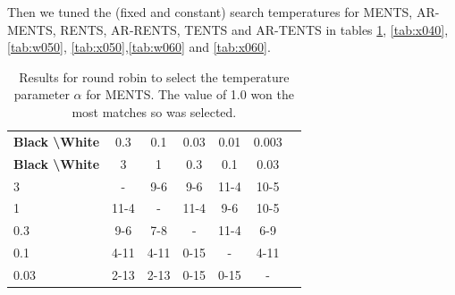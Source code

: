 \documentclass{article}
\theoremstyle{plain}
\begin{document}
\begin{appendices}
            
            
            
            
            
            
            
            
            Then we tuned the (fixed and constant) search temperatures for MENTS, AR-MENTS, RENTS, AR-RENTS, TENTS and AR-TENTS in tables \ref{tab:w040}, \ref{tab:x040},\ref{tab:w050}, \ref{tab:x050},\ref{tab:w060} and \ref{tab:x060}.
            
            
            
            
            \begin{table}[]
            \centering
                \begin{tabular}{l|cccccc}
                    \textbf{Black \textbackslash White}     & 0.3  & 0.1   & 0.03   & 0.01    & 0.003    \\ 
                    \textbf{Black \textbackslash White}     & 3  & 1   & 0.3   & 0.1    & 0.03    \\ 
                    \hline
                                            3            & -     	&   	9-6	&  9-6 		&   	11-4	&  10-5 		\\
                                            1            & 11-4  		& -     	&  11-4		&  9-6 		& 10-5  		\\
                                            0.3          &  9-6  	&  7-8  	&   -   &  11-4 		&  6-9 		\\
                                            0.1          &  4-11 		&   4-11		&   0-15		& -     	&  4-11 		\\
                                            0.03         &   	2-13	&  2-13 		&  0-15 		&   0-15		&   -   	\\      
                \end{tabular}
                \caption{Results for round robin to select the temperature parameter $\alpha$ for MENTS. The value of 1.0 won the most matches so was selected. \label{tab:w040}}
            \end{table}
            

\end{appendices}
\end{document}
